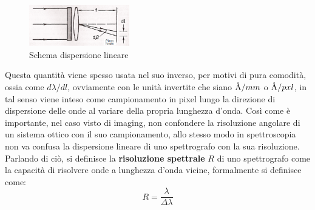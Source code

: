 \begin{figure}
    \centering
    \vspace{-10pt}
    \includegraphics[width=0.39\textwidth]{Immagini/Capitolo3/Spettroscopia_schema_dispersione_lineare.PNG}
    \caption*{Schema dispersione lineare}
    \vspace{-10pt}
\end{figure}

Questa quantità viene spesso usata nel suo inverso, per motivi di pura comodità, ossia come $d\lambda/dl$, ovviamente con le unità invertite che siano $\mbox{\normalfont\AA}/mm$ o $\mbox{\normalfont\AA}/pxl$, in tal senso viene inteso come campionamento in pixel lungo la direzione di dispersione delle onde al variare della propria lunghezza d'onda. Così come è importante, nel caso visto di imaging, non confondere la risoluzione angolare di un sistema ottico con il suo campionamento, allo stesso modo in spettroscopia non va confusa la dispersione lineare di uno spettrografo con la sua risoluzione. Parlando di ciò, si definisce la \textbf{risoluzione spettrale} $R$ di uno spettrografo come la capacità di risolvere onde a lunghezza d'onda vicine, formalmente si definisce come:
\begin{equation}
    \label{def:risoluzione-spettrale}
    R = \frac{\lambda}{\Delta\lambda}
\end{equation}

